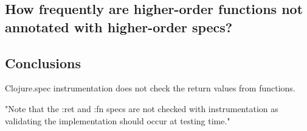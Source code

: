 
\subsection{How frequently are higher-order functions not annotated with higher-order specs?}

\subsection{Conclusions}

Clojure.spec instrumentation does not check the return values from functions.

"Note that the :ret and :fn specs are not checked with instrumentation as validating the implementation should occur at testing time."


